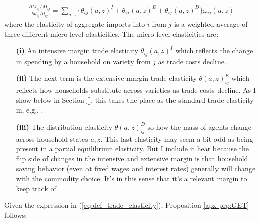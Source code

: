 \documentclass[12pt,pdftex]{article}
\begin{document}
\begin{onehalfspacing}
\begin{align}
\frac{\partial  M_{ij} / M_{ij}}{\partial d_{ij} / d_{ij}} = \sum_{a,z} \bigg \{ \theta_{ij}(a,z)^{I} + \theta_{ij}(a,z)^{E} + \theta_{ij}(a,z)^{D} \bigg \}\omega_{ij}(a,z)
\end{align}
where the elasticity of aggregate imports into $i$ from $j$ is a weighted average of three different micro-level elasticities. The micro-level elasticities are:
\begin{itemize}
\item[\textbf{(i)}] An intensive margin trade elasticity $\theta_{ij}(a,z)^{I}$ which reflects the change in spending by a household on variety from $j$ as trade costs decline.

\item[\textbf{(ii)}]  The next term is the extensive margin trade elasticity $\theta(a,z)_{ij}^{E}$ which reflects how households substitute across varieties as trade costs decline. As I show below in Section \ref{}, this takes the place as the standard trade elasticity in, e.g., \citet{eaton2002technology}.

\item[\textbf{(iii)}] The distribution elasticity $\theta(a,z)_{ij}^{D}$ so how the mass of agents change across household states $a,z$. This last elasticity may seem a bit odd as being present in a partial equilibrium elasticity. But I include it hear because the flip side of changes in the intensive and extensive margin is that household saving behavior (even at fixed wages and interest rates) generally will change with the commodity choice. It's in this sense that it's a relevant margin to keep track of.
\end{itemize}

Given the expression in (\ref{eq:def_trade_elasticity}), Proposition \ref{apx-prp:GET} follows:


\end{onehalfspacing}
\end{document}
